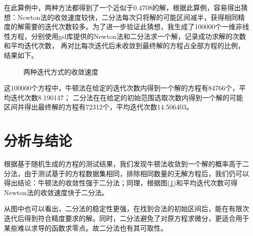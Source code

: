 \documentclass{article}
\begin{document}
     在此算例中，两种方法都得到了一个近似于0.4708的解，根据此算例，容易得出猜想：Newton法的收敛速度较快，二分法每次只将解的可能区间减半，获得相同精度的解需要的迭代次数较多。为了进一步验证此猜想，我生成了100000个一维非线性方程，分别使用gsl库提供的Newton法和二分法求一个解\cite{GSL_roots}，记录成功求解的次数和平均迭代次数，
     再对比每次迭代后未收敛到最终解的方程占全部方程的比例，结果如下。

     \begin{figure}[H]
          \begin{center}
               
          \end{center}
          \label{fig::1}
          \caption{两种迭代方式的收敛速度}
     \end{figure}
     
     这100000个方程中，牛顿法在给定的迭代次数内得到一个解的方程有84766个，平均迭代次数8.190147；
     二分法在在给定的初始范围选取次数内得到一个解的可能区间并得出最终解的方程有72312个，平均迭代次数14.506403。
\section{分析与结论}
     根据基于随机生成的方程的测试结果，我们发现牛顿法收敛到一个解的概率高于二分法，由于测试基于的方程数据集相同，排除相同数量的无解方程后，我们仍可以得出结论：牛顿法的收敛性强于二分法；同理，根据图(\ref{fig::1})和平均迭代次数可得Newton法的收敛速度快于二分法。
     
     从图中也可以看出，二分法的稳定性更强，在找到合法的初始区间后，能在有限次迭代后得到符合精度要求的解。同时，二分法避免了对原方程求微分，更适合用于某些难以求导的函数求零点。故二分法也有其可取性。
     

\end{document}
